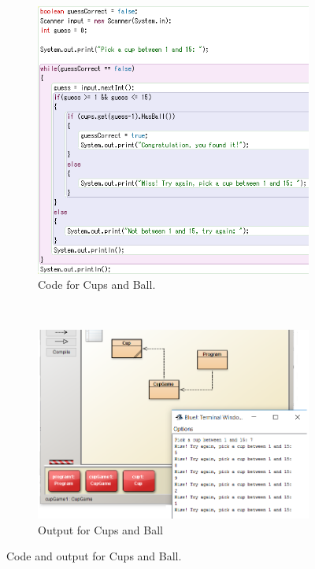 \begin{figure}[!h]
  \centering      
    \begin{subfigure}[b]{0.45\textwidth}
    \begin{center}
      \includegraphics[scale=0.6]{./pics/bluej_ballcup_actual_code}
      \caption{Code for Cups and Ball.}
      \label{fig:bluej_ballcup_code2}
    \end{center}
    \end{subfigure}
    ~
    \begin{subfigure}[b]{0.45\textwidth}
    \begin{center}
      \includegraphics[scale=0.6]{./pics/bluej_ballcup_code}
      \caption{Output for Cups and Ball}
      \label{fig:bluej_ballcup_code}
    \end{center}
    \end{subfigure}
    \caption{Code and output for Cups and Ball.}
    \label{fig:bluej_ballcup}
\end{figure}

